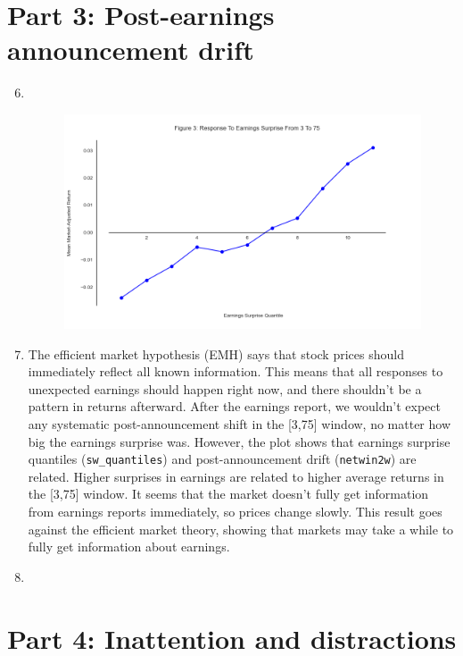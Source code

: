 \documentclass[11pt]{article}
\begin{document}
\section{Part 3: Post-earnings announcement drift}

\begin{enumerate}
\setcounter{enumi}{5}
\renewcommand{\labelenumi}{(\theenumi)}
    \item \, \\
    \begin{figure}[H] 
        \centering
        \includegraphics[width=.8\textwidth]{fig3.png}
    \end{figure}
    
    \item The efficient market hypothesis (EMH) says that stock prices should immediately reflect all known information. 
    This means that all responses to unexpected earnings should happen right now, and there shouldn't be a pattern in 
    returns afterward. After the earnings report, we wouldn't expect any systematic post-announcement shift in 
    the [3,75] window, no matter how big the earnings surprise was. However, the plot shows that earnings surprise 
    quantiles (\texttt{sw\_quantiles}) and post-announcement drift (\texttt{netwin2w}) are related. Higher surprises 
    in earnings are related to higher average returns in the [3,75] window. It seems that the market doesn’t fully get 
    information from earnings reports immediately, so prices change slowly. This result goes against the efficient 
    market theory, showing that markets may take a while to fully get information about earnings.
    
    \item 


\end{enumerate}

\section{Part 4: Inattention and distractions}
\end{document}
